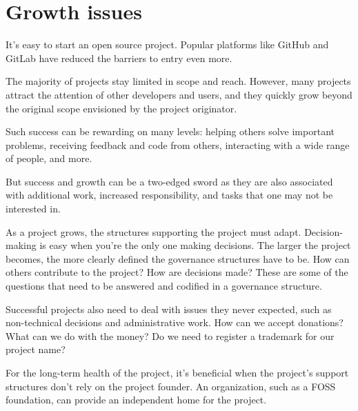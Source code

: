 


\chapter{Growth issues}

It's easy to start an open source project.  Popular platforms like GitHub and GitLab have reduced the barriers to entry even more.

The majority of projects stay limited in scope and reach.  However, many projects attract the attention of other developers and users, and they quickly grow beyond the original scope envisioned by the project originator.

Such success can be rewarding on many levels: helping others solve important problems, receiving feedback and code from others, interacting with a wide range of people, and more.

But success and growth can be a two-edged sword as they are also associated with additional work, increased responsibility, and tasks that one may not be interested in.

As a project grows, the structures supporting the project must adapt.  Decision-making is easy when you're the only one making decisions.  The larger the project becomes, the more clearly defined the governance structures have to be.  How can others contribute to the project?  How are decisions made?  These are some of the questions that need to be answered and codified in a governance structure.

Successful projects also need to deal with issues they never expected, such as non-technical decisions and administrative work.  How can we accept donations?  What can we do with the money?  Do we need to register a trademark for our project name?

For the long-term health of the project, it's beneficial when the project's support structures don't rely on the project founder.  An organization, such as a FOSS foundation, can provide an independent home for the project.

